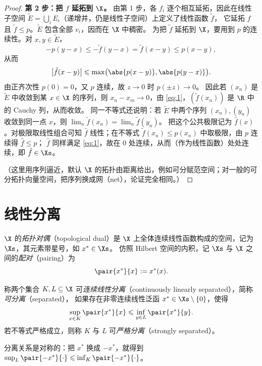 \begin{proof}
\textbf{第 2 步：把 $f$ 延拓到 $\X$。}
由第 1 步，各 $f_i$ 逐个相互延拓，因此在线性子空间 $\tilde E=\bigcup_iE_i$（递增并，仍是线性子空间）上定义了线性函数 $\tilde f$，
它延拓 $f$ 且 $\tilde f\leqslant p$。$\tilde E$ 包含全部 $v_i$，因而在 $\X$ 中稠密。
为把 $\tilde f$ 延拓到 $\X$，要用到 $p$ 的连续性。对 $x,y\in\tilde E$，
\[
  -p(y-x)\leqslant-\tilde f(y-x)=\tilde f(x-y)\leqslant p(x-y),
\]
从而
\begin{equation}
  \label{eq:1}
  \bigl|\tilde f(x-y)\bigr|\leqslant\max\bigl(\abs{p(x-y)},\abs{p(y-x)}\bigr).
\end{equation}
由正齐次性 $p(0)=0$，又 $p$ 连续，故 $z\to0$ 时 $p(\pm z)\to0$。
因此若 $(x_n)$ 是 $\tilde E$ 中收敛到某 $x\in\X$ 的序列，则 $x_n-x_m\to0$，由 \eqref{eq:1}，$(\tilde f(x_n))$ 是 $\R$ 中的 Cauchy 列，从而收敛。
同一不等式还说明：若 $\tilde E$ 中两个序列 $(x_n),(y_n)$ 收敛到同一点 $x$，则 $\lim_n\tilde f(x_n)=\lim_n\tilde f(y_n)$。
把这个公共极限记为 $\hat f(x)$。对极限取线性组合可知 $\hat f$ 线性；在不等式 $\tilde f(x_n)\leqslant p(x_n)$ 中取极限，由 $p$ 连续得 $\hat f\leqslant p$；
$\hat f$ 同样满足 \eqref{eq:1}，故在 $0$ 处连续，从而（作为线性函数）处处连续，即 $\hat f\in\Xs$。

（这里用序列逼近，默认 $\X$ 的拓扑由距离给出，例如可分赋范空间；对一般的可分拓扑向量空间，把序列换成网（net），论证完全相同。）
\end{proof}

\section{线性分离}

$\X$ 的\emph{拓扑对偶}（topological dual）是 $\X$ 上全体连续线性函数构成的空间，记为 $\Xs$，其元素带星号，如 $x^*\in\Xs$。
仿照 Hilbert 空间的内积，记 $\Xs$ 与 $\X$ 之间的\emph{配对}（pairing）为
\[
  \pair{x^*}{x}:=x^*(x).
\]

\begin{definition}[分离]
\label{def:6}
称两个集合 $K,L\subseteq\X$ 可\emph{连续线性分离}（continuously linearly separated），简称\emph{可分离}（separated），
如果存在非零连续线性泛函 $x^*\in\Xs\setminus\{0\}$，使得
\[
  \sup_{x\in K}\pair{x^*}{x}\leqslant\inf_{y\in L}\pair{x^*}{y}.
\]
若不等式严格成立，则称 $K$ 与 $L$ 可\emph{严格分离}（strongly separated）。
\end{definition}

分离关系是对称的：把 $x^*$ 换成 $-x^*$，就得到 $\sup_L\pair{-x^*}{\cdot}\leqslant\inf_K\pair{-x^*}{\cdot}$。

